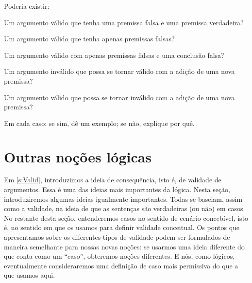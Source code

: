\problempart
\label{pr.EnglishCombinations}
Poderia existir:
	\begin{compactlist}
		\item Um argumento válido que tenha uma premissa falsa e uma premissa verdadeira?
		\item Um argumento válido que tenha apenas premissas falsas?
		\item Um argumento válido com apenas premissas falsas e uma conclusão falsa?
		\item Um argumento inválido que possa se tornar válido com a adição de uma nova premissa?
		\item Um argumento válido que possa se tornar inválido com a adição de uma nova premissa?
	\end{compactlist}
Em cada caso: se sim, dê um exemplo; se não, explique por quê.

\chapter{Outras noções lógicas}\label{s:BasicNotions}

Em \cref{s:Valid}, introduzimos a ideia de consequência, isto é, de validade de argumentos. Essa é uma das ideias mais importantes da lógica. Nesta seção, introduziremos algumas ideias igualmente importantes. Todas se baseiam, assim como a validade, na ideia de que as sentenças são verdadeiras (ou não) em casos. No restante desta seção, entenderemos casos no sentido de cenário concebível, isto é, no sentido em que os usamos para definir validade conceitual. Os pontos que apresentamos sobre os diferentes tipos de validade podem ser formulados de maneira semelhante para nossas novas noções: se usarmos uma ideia diferente do que conta como um \textquotedblleft caso\textquotedblright{}, obteremos noções diferentes. E nós, como lógicos, eventualmente consideraremos uma definição de caso mais permissiva do que a que usamos aqui.


